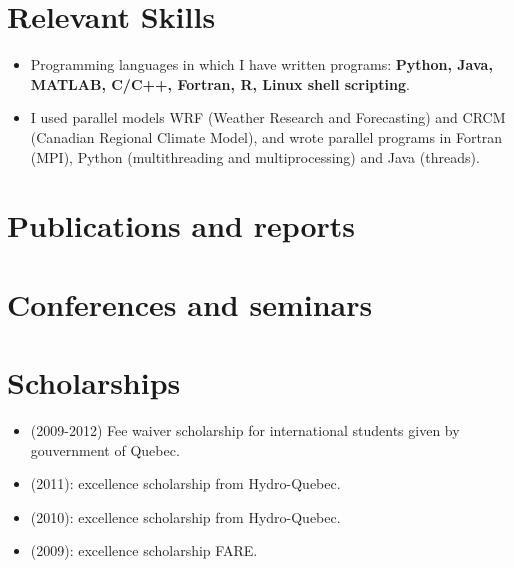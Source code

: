 \documentclass[12pt,a4paper,sans]{moderncv}
\begin{document}
\section*{Relevant Skills}
\begin{itemize}
  \item Programming languages in which I have written programs: \textbf{ Python,
  Java, MATLAB, C/C++, Fortran, R, Linux shell scripting}.
  \item I used parallel models WRF (Weather Research and Forecasting) and CRCM
  (Canadian Regional Climate Model), and wrote parallel programs in Fortran
  (MPI), Python (multithreading and multiprocessing) and Java (threads).
\end{itemize}



\section*{Publications and reports}
\vspace{0.5cm}


\section*{Conferences and seminars}





\section*{Scholarships}

\begin{itemize}
    \item (2009-2012) Fee waiver scholarship for international students given
    by gouvernment of Quebec.
    \item (2011): excellence scholarship from Hydro-Quebec.
    \item (2010): excellence scholarship from Hydro-Quebec.
    \item (2009): excellence scholarship FARE.
\end{itemize}
\end{document}
